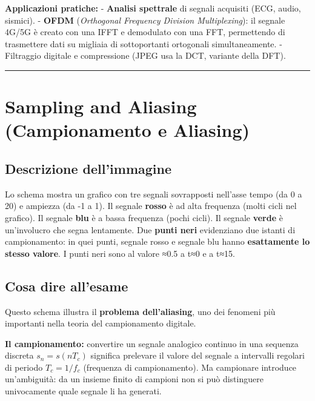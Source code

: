 \documentclass[
  italian,
  openany]{book}
\begin{document}
\textbf{Applicazioni pratiche:} - \textbf{Analisi spettrale} di segnali
acquisiti (ECG, audio, sismici). - \textbf{OFDM} (\emph{Orthogonal
Frequency Division Multiplexing}): il segnale 4G/5G è creato con una
IFFT e demodulato con una FFT, permettendo di trasmettere dati su
migliaia di sottoportanti ortogonali simultaneamente. - Filtraggio
digitale e compressione (JPEG usa la DCT, variante della DFT).

\begin{center}\rule{0.5\linewidth}{0.5pt}\end{center}

\section{Sampling and Aliasing (Campionamento e
Aliasing)}\label{sampling-and-aliasing-campionamento-e-aliasing}

\subsection{Descrizione
dell'immagine}\label{descrizione-dellimmagine-16}

Lo schema mostra un grafico con tre segnali sovrapposti nell'asse tempo
(da 0 a 20) e ampiezza (da -1 a 1). Il segnale \textbf{rosso} è ad alta
frequenza (molti cicli nel grafico). Il segnale \textbf{blu} è a bassa
frequenza (pochi cicli). Il segnale \textbf{verde} è un'involucro che
segna lentamente. Due \textbf{punti neri} evidenziano due istanti di
campionamento: in quei punti, segnale rosso e segnale blu hanno
\textbf{esattamente lo stesso valore}. I punti neri sono al valore ≈0.5
a t≈0 e a t≈15.

\subsection{Cosa dire all'esame}\label{cosa-dire-allesame-16}

Questo schema illustra il \textbf{problema dell'aliasing}, uno dei
fenomeni più importanti nella teoria del campionamento digitale.

\textbf{Il campionamento:} convertire un segnale analogico continuo in
una sequenza discreta \(s_n = s(nT_c)\) significa prelevare il valore
del segnale a intervalli regolari di periodo \(T_c = 1/f_c\) (frequenza
di campionamento). Ma campionare introduce un'ambiguità: da un insieme
finito di campioni non si può distinguere univocamente quale segnale li
ha generati.
\end{document}
